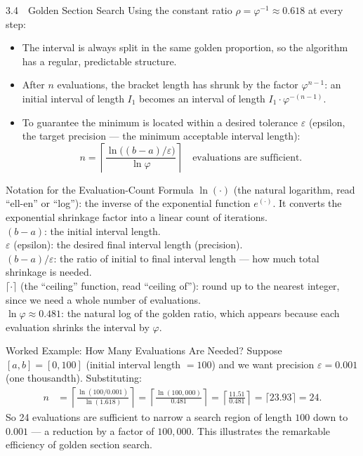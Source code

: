 \documentclass[aspectratio=169,10pt]{beamer}
\begin{document}
\begin{frame}[allowframebreaks]{3.4\ \ Golden Section Search}
  Using the constant ratio $\rho = \varphi^{-1} \approx 0.618$ at every step:
  \begin{itemize}
    \item The interval is always split in the same golden proportion, so the
          algorithm has a regular, predictable structure.
    \item After $n$ evaluations, the bracket length has shrunk by the factor
          $\varphi^{n-1}$: an initial interval of length $I_1$ becomes an
          interval of length $I_1 \cdot \varphi^{-(n-1)}$.
    \item To guarantee the minimum is located within a desired tolerance
          $\varepsilon$ (epsilon, the target precision --- the minimum
          acceptable interval length):
          \[
            n = \left\lceil
              \frac{\ln\bigl((b-a)/\varepsilon\bigr)}{\ln \varphi}
            \right\rceil
            \quad \text{evaluations are sufficient.}
          \]
  \end{itemize}

  \begin{block}{Notation for the Evaluation-Count Formula}
    $\ln(\cdot)$ (the natural logarithm, read ``ell-en'' or ``log''): the
    inverse of the exponential function $e^{(\cdot)}$.  It converts the
    exponential shrinkage factor into a linear count of iterations.\\
    $(b - a)$: the initial interval length.\\
    $\varepsilon$ (epsilon): the desired final interval length (precision).\\
    $(b-a)/\varepsilon$: the ratio of initial to final interval length ---
    how much total shrinkage is needed.\\
    $\lceil \cdot \rceil$ (the ``ceiling'' function, read ``ceiling of''): round up
    to the nearest integer, since we need a whole number of evaluations.\\
    $\ln \varphi \approx 0.481$: the natural log of the golden ratio, which
    appears because each evaluation shrinks the interval by $\varphi$.
  \end{block}

  \begin{exampleblock}{Worked Example: How Many Evaluations Are Needed?}
    Suppose $[a, b] = [0, 100]$ (initial interval length $= 100$) and we
    want precision $\varepsilon = 0.001$ (one thousandth).  Substituting:
    \begin{align*}
      n &= \left\lceil \frac{\ln(100 / 0.001)}{\ln(1.618)} \right\rceil
        = \left\lceil \frac{\ln(100{,}000)}{0.481} \right\rceil
        = \left\lceil \frac{11.51}{0.481} \right\rceil
        = \lceil 23.93 \rceil = 24.
    \end{align*}
    So 24 evaluations are sufficient to narrow a search region of length $100$
    down to $0.001$ --- a reduction by a factor of $100{,}000$.  This illustrates
    the remarkable efficiency of golden section search.
  \end{exampleblock}


\end{frame}
\end{document}
